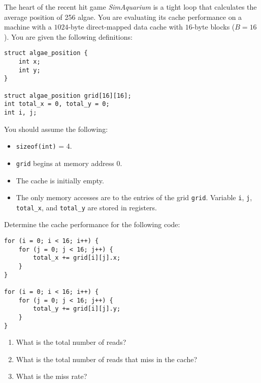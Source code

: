 \documentclass[12pt]{article}
\newenvironment{ex}[2][Exercise]{\begin{trivlist}
		\item[\hskip \labelsep {\bfseries #1}\hskip \labelsep {\bfseries #2.}]}{\end{trivlist}}
\begin{document}
\begin{ex}{6.18}
	The heart of the recent hit game \emph{SimAquarium} is a tight loop that calculates the
	average position of 256 algae. You are evaluating its cache performance on a machine with
	a $1024$-byte direct-mapped data cache with $16$-byte blocks ($B=16$). You are given
	the following definitions:
	\begin{lstlisting}
struct algae_position {
	int x;
	int y;
}

struct algae_position grid[16][16];
int total_x = 0, total_y = 0;
int i, j;
	\end{lstlisting}
	You should assume the following:
	\begin{itemize}
		\item \texttt{sizeof(int)} = 4.
		\item \texttt{grid} begins at memory address 0.
		\item The cache is initially empty.
		\item The only memory accesses are to the entries of the grid \texttt{grid}. Variable
		\texttt{i}, \texttt{j}, \texttt{total\_x}, and \texttt{total\_y} are stored in registers.
	\end{itemize}
	Determine the cache performance for the following code:
	\begin{lstlisting}
for (i = 0; i < 16; i++) {
	for (j = 0; j < 16; j++) {
		total_x += grid[i][j].x;
	}
}

for (i = 0; i < 16; i++) {
	for (j = 0; j < 16; j++) {
		total_y += grid[i][j].y;
	}
}
	\end{lstlisting}
	\begin{enumerate}[label=(\alph*)]
		\item What is the total number of reads?
		\item What is the total number of reads that miss in the cache?
		\item What is the miss rate?
	\end{enumerate}
\end{ex}
\end{document}
